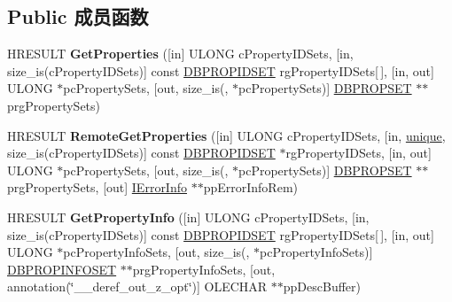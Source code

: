 \subsection*{Public 成员函数}
\begin{DoxyCompactItemize}
\item 
\mbox{\label{interface_i_d_b_properties_ab45083ce2ee928bb4ef65ab187f09a0b}} 
H\+R\+E\+S\+U\+LT {\bfseries Get\+Properties} (\mbox{[}in\mbox{]} U\+L\+O\+NG c\+Property\+I\+D\+Sets, \mbox{[}in, size\+\_\+is(c\+Property\+I\+D\+Sets)\mbox{]} const \hyperlink{structtag_d_b_p_r_o_p_i_d_s_e_t}{D\+B\+P\+R\+O\+P\+I\+D\+S\+ET} rg\+Property\+I\+D\+Sets\mbox{[}$\,$\mbox{]}, \mbox{[}in, out\mbox{]} U\+L\+O\+NG $\ast$pc\+Property\+Sets, \mbox{[}out, size\+\_\+is(, $\ast$pc\+Property\+Sets)\mbox{]} \hyperlink{structtag_d_b_p_r_o_p_s_e_t}{D\+B\+P\+R\+O\+P\+S\+ET} $\ast$$\ast$prg\+Property\+Sets)
\item 
\mbox{\label{interface_i_d_b_properties_a3000f0a612c5a3f7f3931e024b44ef0a}} 
H\+R\+E\+S\+U\+LT {\bfseries Remote\+Get\+Properties} (\mbox{[}in\mbox{]} U\+L\+O\+NG c\+Property\+I\+D\+Sets, \mbox{[}in, \hyperlink{interfaceunique}{unique}, size\+\_\+is(c\+Property\+I\+D\+Sets)\mbox{]} const \hyperlink{structtag_d_b_p_r_o_p_i_d_s_e_t}{D\+B\+P\+R\+O\+P\+I\+D\+S\+ET} $\ast$rg\+Property\+I\+D\+Sets, \mbox{[}in, out\mbox{]} U\+L\+O\+NG $\ast$pc\+Property\+Sets, \mbox{[}out, size\+\_\+is(, $\ast$pc\+Property\+Sets)\mbox{]} \hyperlink{structtag_d_b_p_r_o_p_s_e_t}{D\+B\+P\+R\+O\+P\+S\+ET} $\ast$$\ast$prg\+Property\+Sets, \mbox{[}out\mbox{]} \hyperlink{interface_i_error_info}{I\+Error\+Info} $\ast$$\ast$pp\+Error\+Info\+Rem)
\item 
\mbox{\label{interface_i_d_b_properties_a73b88ba814d50741d00670a68e1f80eb}} 
H\+R\+E\+S\+U\+LT {\bfseries Get\+Property\+Info} (\mbox{[}in\mbox{]} U\+L\+O\+NG c\+Property\+I\+D\+Sets, \mbox{[}in, size\+\_\+is(c\+Property\+I\+D\+Sets)\mbox{]} const \hyperlink{structtag_d_b_p_r_o_p_i_d_s_e_t}{D\+B\+P\+R\+O\+P\+I\+D\+S\+ET} rg\+Property\+I\+D\+Sets\mbox{[}$\,$\mbox{]}, \mbox{[}in, out\mbox{]} U\+L\+O\+NG $\ast$pc\+Property\+Info\+Sets, \mbox{[}out, size\+\_\+is(, $\ast$pc\+Property\+Info\+Sets)\mbox{]} \hyperlink{structtag_d_b_p_r_o_p_i_n_f_o_s_e_t}{D\+B\+P\+R\+O\+P\+I\+N\+F\+O\+S\+ET} $\ast$$\ast$prg\+Property\+Info\+Sets, \mbox{[}out, annotation(\char`\"{}\+\_\+\+\_\+deref\+\_\+out\+\_\+z\+\_\+opt\char`\"{})\mbox{]} O\+L\+E\+C\+H\+AR $\ast$$\ast$pp\+Desc\+Buffer)
$$
\end{DoxyCompactItemize}
